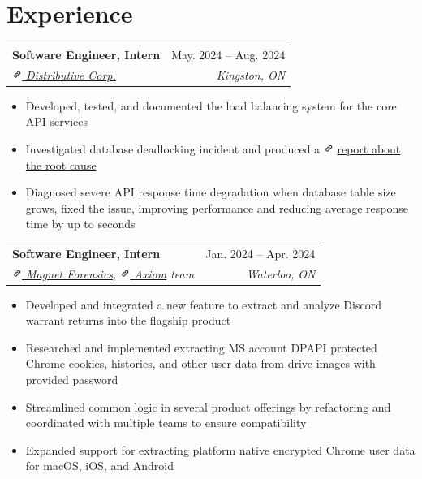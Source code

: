 \documentclass[letterpaper, 10pt]{report}
\makeatletter
\newcommand{\resumeSubheading}[4]{
    \begin{tabular*}{\textwidth}[t]{l@{\extracolsep{\fill}}r}
        \textbf{#1}       & #2                \\
        \textit{\small#3} & \textit{\small#4} \\
    \end{tabular*}\vspace{-0.7em}
}
\newenvironment{ResumeItem}{
    \vspace{-0.3em}
    \begin{itemize}
        \setlength\itemsep{-0.3em}
        }{
    \end{itemize}\vspace{-0.3em}}
\newcommand{\linkIcon}{\includegraphics[height=9pt, trim=0 5cm 0 -1.5cm]{./img/link-icon}}
\makeatother
\begin{document}
\section{Experience}
\resumeSubheading
{Software Engineer, Intern}{May. 2024 -- Aug. 2024}
{\href{https://distributive.network/}{\linkIcon{} Distributive Corp.}}{Kingston, ON}
\begin{ResumeItem}
    \item{Developed, tested, and documented the load balancing system for the core API services}
    \item{Investigated database deadlocking incident and produced a \linkIcon{}
        \href{https://internal-compiler-error.com/mysql-read-commited-gap-lock.html}{report about the root cause}
    }
    \item{Diagnosed severe API response time degradation when database table size grows, fixed the issue, improving performance and reducing average response time by up to seconds}
\end{ResumeItem}

\resumeSubheading
{Software Engineer, Intern}{Jan. 2024 -- Apr. 2024}
{\href{https://www.magnetforensics.com/}{\linkIcon{} Magnet Forensics}, \href{https://www.magnetforensics.com/products/magnet-axiom/}{\linkIcon{} Axiom} team}{Waterloo, ON}
\begin{ResumeItem}
    \item{Developed and integrated a new feature to extract and analyze Discord warrant returns into the flagship product}
    \item{Researched and implemented extracting MS account DPAPI protected Chrome cookies, histories, and other user data from drive images with provided password}
    \item{Streamlined common logic in several product offerings by refactoring and coordinated with multiple teams to ensure compatibility}
    \item{Expanded support for extracting platform native encrypted Chrome user data for macOS, iOS, and Android}
\end{ResumeItem}
\end{document}
